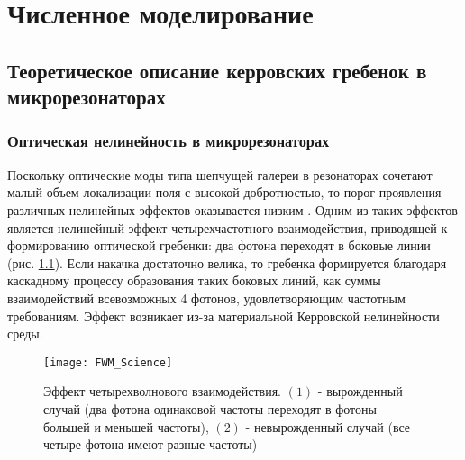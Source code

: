 \chapter{Численное моделирование} \label{chapt2}

\section{Теоретическое описание керровских гребенок в микрорезонаторах}

\subsection{Оптическая нелинейность в микрорезонаторах}
Поскольку оптические моды типа шепчущей галереи в резонаторах сочетают малый объем локализации поля с высокой добротностью, то порог проявления различных нелинейных эффектов оказывается низким \cite{Gorodetsky}. Одним из таких эффектов является нелинейный эффект четырехчастотного взаимодействия, приводящей к формированию оптической гребенки: два фотона переходят в боковые линии (рис. \ref{cascading}). Если накачка достаточно велика, то гребенка формируется благодаря каскадному процессу образования таких боковых линий, как суммы взаимодействий всевозможных 4 фотонов, удовлетворяющим частотным требованиям. Эффект возникает из-за материальной Керровской нелинейности среды.

\begin{figure}
  \centering
  \texttt{[image: FWM\_Science]}
  \caption{Эффект четырехволнового взаимодействия. $(1)$ - вырожденный случай (два фотона одинаковой частоты переходят в фотоны большей и меньшей частоты), $(2)$ - невырожденный случай (все четыре фотона имеют разные частоты)} \label{cascading}
\end{figure}



